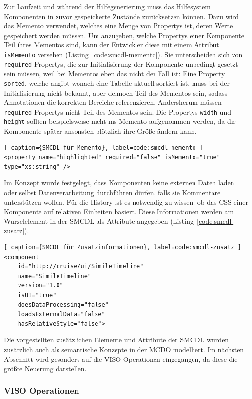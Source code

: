 \documentclass[
	headsepline,
	footsepline,
	fontsize=12pt,
	bibliography=totoc
]{scrbook}
\begin{document}
Zur Laufzeit und während der Hilfegenerierung muss das Hilfesystem Komponenten in zuvor gespeicherte Zustände zurücksetzen können. Dazu wird das Memento verwendet, welches eine Menge von Propertys ist, deren Werte gespeichert werden müssen. Um anzugeben, welche Propertys einer Komponente Teil ihres Mementos sind, kann der Entwickler diese mit einem Attribut \texttt{isMemento} versehen (Listing~\ref{code:smcdl-memento}). Sie unterscheiden sich von \texttt{required} Propertys, die zur Initialisierung der Komponente unbedingt gesetzt sein müssen, weil bei Mementos eben das nicht der Fall ist: Eine Property \texttt{sorted}, welche angibt wonach eine Tabelle aktuell sortiert ist, muss bei der Initialisierung nicht bekannt, aber dennoch Teil des Mementos sein, sodass Annotationen die korrekten Bereiche referenzieren. Andersherum müssen \texttt{required} Propertys nicht Teil des Mementos sein. Die Propertys \texttt{width} und \texttt{height} sollten beispielsweise nicht ins Memento aufgenommen werden, da die Komponente später ansonsten plötzlich ihre Größe ändern kann.

\lstset{language=XML}
\begin{lstlisting}[ caption={SMCDL für Memento}, label=code:smcdl-memento ]
<property name="highlighted" required="false" isMemento="true" type="xs:string" />
\end{lstlisting}

Im Konzept wurde festgelegt, dass Komponenten keine externen Daten laden oder selbst Datenverarbeitung durchführen dürfen, falls sie Kommentare unterstützen wollen. Für die History ist es notwendig zu wissen, ob das CSS einer Komponente auf relativen Einheiten basiert. Diese Informationen werden am Wurzelelement in der SMCDL als Attribute angegeben (Listing~\ref{code:smcdl-zusatz}).

\lstset{language=XML}
\begin{lstlisting}[ caption={SMCDL für Zusatzinformationen}, label=code:smcdl-zusatz ]
<component
	id="http://cruise/ui/SimileTimeline"
	name="SimileTimeline"
	version="1.0"
	isUI="true"
	doesDataProcessing="false"
	loadsExternalData="false"
	hasRelativeStyle="false">
\end{lstlisting}

Die vorgestellten zusätzlichen Elemente und Attribute der SMCDL wurden zusätzlich auch als semantische Konzepte in der MCDO modelliert. Im nächsten Abschnitt wird gesondert auf die VISO Operationen eingegangen, da diese die größte Neuerung darstellen.

\subsubsection{VISO Operationen}
\end{document}
